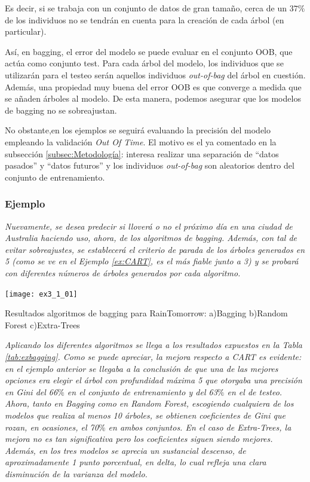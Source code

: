 \documentclass[12pt,twoside]{article}
\begin{document}
Es decir, si se trabaja con un conjunto de datos de gran tamaño, cerca de un $37 \%$ de los individuos no se tendrán en cuenta para la creación de cada árbol (en particular).

Así, en bagging, el error del modelo se puede evaluar en el conjunto OOB, que actúa como conjunto test. Para cada árbol del modelo, los individuos que se utilizarán para el testeo serán aquellos individuos \textit{out-of-bag} del árbol en cuestión. Además, una propiedad muy buena del error OOB es que converge a medida que se añaden árboles al modelo. De esta manera, podemos asegurar que los modelos de bagging no se sobreajustan.

No obstante,en los ejemplos se seguirá evaluando la precisión del modelo empleando la validación \textit{Out Of Time}. El motivo es el ya comentado en la subsección \ref{subsec:Metodología}: interesa realizar una separación de ``datos pasados'' y ``datos futuros'' y los individuos \textit{out-of-bag} son aleatorios dentro del conjunto de entrenamiento.




\subsubsection{Ejemplo} \label{ex:Bag}
\emph{Nuevamente, se desea predecir si lloverá o no el próximo día en una ciudad de Australia haciendo uso, ahora, de los algoritmos de bagging. Además, con tal de evitar sobreajustes, se establecerá el criterio de parada de los árboles generados en 5 (como se ve en el Ejemplo \ref{ex:CART}, es el más fiable junto a 3) y se probará con diferentes números de árboles generados por cada algoritmo.}

\begin{table}[h]
\centering
\texttt{[image: ex3\_1\_01]}
\caption{Resultados algoritmos de bagging para RainTomorrow: a)Bagging b)Random Forest c)Extra-Trees}
\label{tab:exbagging}
\end{table}

\emph{Aplicando los diferentes algoritmos se llega a los resultados expuestos en la Tabla \ref{tab:exbagging}. Como se puede apreciar, la mejora respecto a CART es evidente: en el ejemplo anterior se llegaba a la conclusión de que una de las mejores opciones era elegir el árbol con profundidad máxima 5 que otorgaba una precisión en Gini del 66$\%$ en el conjunto de entrenamiento y del 63$\%$ en el de testeo. Ahora, tanto en Bagging como en Random Forest, escogiendo cualquiera de los modelos que realiza al menos 10 árboles, se obtienen coeficientes de Gini que rozan, en ocasiones, el 70$\%$ en ambos conjuntos. En el caso de Extra-Trees, la mejora no es tan significativa pero los coeficientes siguen siendo mejores. Además, en los tres modelos se aprecia un sustancial descenso, de aproximadamente 1 punto porcentual, en delta, lo cual refleja una clara disminución de la varianza del modelo. }
\end{document}
